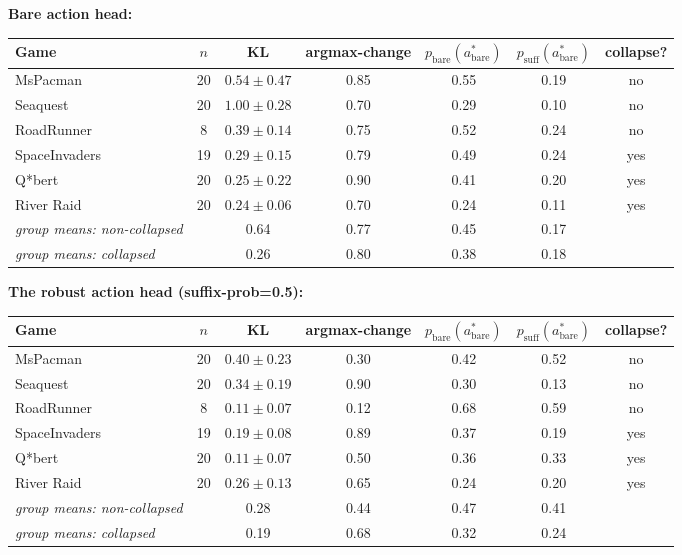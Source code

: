 \documentclass[11pt]{article}
\begin{document}
\smallskip\noindent\textbf{Bare action head:}

\smallskip\noindent
{\small\setlength{\tabcolsep}{4.5pt}
\begin{tabular}{lcccccc}
\toprule
Game & $n$ & KL & argmax-change & $p_{\text{bare}}(a^*_{\text{bare}})$ & $p_{\text{suff}}(a^*_{\text{bare}})$ & collapse? \\
\midrule
MsPacman      & 20 & $0.54\pm0.47$ & 0.85 & 0.55 & 0.19 & no  \\
Seaquest      & 20 & $1.00\pm0.28$ & 0.70 & 0.29 & 0.10 & no  \\
RoadRunner    &  8 & $0.39\pm0.14$ & 0.75 & 0.52 & 0.24 & no  \\
SpaceInvaders & 19 & $0.29\pm0.15$ & 0.79 & 0.49 & 0.24 & yes \\
Q*bert        & 20 & $0.25\pm0.22$ & 0.90 & 0.41 & 0.20 & yes \\
River Raid    & 20 & $0.24\pm0.06$ & 0.70 & 0.24 & 0.11 & yes \\
\midrule
\textit{group means: non-collapsed} & & 0.64 & 0.77 & 0.45 & 0.17 & \\
\textit{group means: collapsed}     & & 0.26 & 0.80 & 0.38 & 0.18 & \\
\bottomrule
\end{tabular}}\smallskip

\smallskip\noindent\textbf{The robust action head (suffix-prob=0.5):}

\smallskip\noindent
{\small\setlength{\tabcolsep}{4.5pt}
\begin{tabular}{lcccccc}
\toprule
Game & $n$ & KL & argmax-change & $p_{\text{bare}}(a^*_{\text{bare}})$ & $p_{\text{suff}}(a^*_{\text{bare}})$ & collapse? \\
\midrule
MsPacman      & 20 & $0.40\pm0.23$ & 0.30 & 0.42 & 0.52 & no  \\
Seaquest      & 20 & $0.34\pm0.19$ & 0.90 & 0.30 & 0.13 & no  \\
RoadRunner    &  8 & $0.11\pm0.07$ & 0.12 & 0.68 & 0.59 & no  \\
SpaceInvaders & 19 & $0.19\pm0.08$ & 0.89 & 0.37 & 0.19 & yes \\
Q*bert        & 20 & $0.11\pm0.07$ & 0.50 & 0.36 & 0.33 & yes \\
River Raid    & 20 & $0.26\pm0.13$ & 0.65 & 0.24 & 0.20 & yes \\
\midrule
\textit{group means: non-collapsed} & & 0.28 & 0.44 & 0.47 & 0.41 & \\
\textit{group means: collapsed}     & & 0.19 & 0.68 & 0.32 & 0.24 & \\
\bottomrule
\end{tabular}}\smallskip
\end{document}
